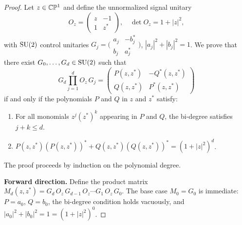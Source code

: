 \begin{proof}
	Let $z \in \mathbb{C}\mathbb{P}^1$ and define the unnormalized
	signal unitary
	\begin{equation}
		O_z = \begin{pmatrix} z & -1 \\ 1 & z^* \end{pmatrix},
		\quad \det O_z = 1 + |z|^2,
		\tag{A21}
	\end{equation}
	with $\mathrm{SU}(2)$ control unitaries
	$G_j = \bigl(\begin{smallmatrix} a_j & -b_j^* \\
				b_j & a_j^* \end{smallmatrix}\bigr)$,
	$|a_j|^2 + |b_j|^2 = 1$.
	We prove that there exist $G_0, \ldots, G_d \in \mathrm{SU}(2)$
	such that
	\begin{equation}
		G_d \prod_{j=1}^{d} O_z\,G_j
		= \begin{pmatrix} P(z, z^*) & -Q^*(z, z^*) \\
			Q(z, z^*) & P^*(z, z^*) \end{pmatrix}
		\tag{A22}
	\end{equation}
	if and only if the polynomials $P$ and $Q$ in $z$ and
	$z^*$ satisfy:
	\begin{enumerate}
		\item For all monomials $z^j (z^*)^k$ appearing in
		      $P$ and $Q$, the bi-degree satisfies $j + k \leq d$.
		\item $P(z, z^*)(P(z, z^*))^* + Q(z, z^*)(Q(z, z^*))^*
			      = (1 + |z|^2)^d$.
	\end{enumerate}
	The proof proceeds by induction on the polynomial degree.

	\medskip
	\noindent\textbf{Forward direction.}\quad
	Define the product matrix
	$M_d(z, z^*) = G_d\,O_z\,G_{d-1}\,O_z \cdots G_1\,O_z\,G_0$.
	The base case $M_0 = G_0$ is immediate: $P = a_0$,
	$Q = b_0$, the bi-degree condition holds vacuously,
	and $|a_0|^2 + |b_0|^2 = 1 = (1+|z|^2)^0$.


\end{proof}
